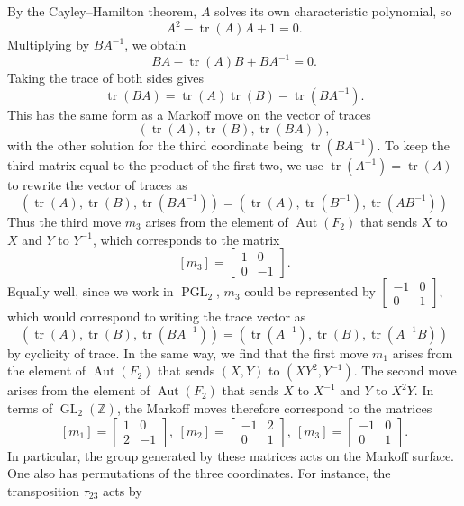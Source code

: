 \documentclass[AHL, Unicode, longabstracts, published]{cedram}
\newcommand{\Z}{\mathbb{Z}}
\DeclareMathOperator{\tr}{tr}
\DeclareMathOperator{\GL}{GL}
\DeclareMathOperator{\PGL}{PGL}
\DeclareMathOperator{\Aut}{Aut}
\DeclareMathOperator{\GL}{GL}
\newcommand{\Z}{\mathbb{Z}}
\begin{document}
By the Cayley--Hamilton theorem, $A$ solves its own characteristic polynomial, so
\[
A^2 - \tr(A)A + 1 = 0.
\]
Multiplying by $BA^{-1}$, we obtain
\[
BA - \tr(A)B+ BA^{-1} = 0.
\]
Taking the trace of both sides gives
\[
\tr(BA) = \tr(A)\tr(B) - \tr\left(BA^{-1}\right).
\]
This has the same form as a Markoff move on the vector of traces
\[
(\tr(A),\tr(B),\tr(BA)),
\]
with the other solution for the third coordinate being $\tr(BA^{-1})$. To keep the third matrix equal to the product of the first two, we use $\tr(A^{-1}) = \tr(A)$ to rewrite the vector of traces as
\[
\left(\tr(A),\tr(B),\tr\left(BA^{-1}\right)\right) = \left(\tr(A), \tr\left(B^{-1}\right), \tr\left(AB^{-1}\right)\right)
\]
Thus the third move $m_3$ arises from the element of $\Aut(F_2)$ that sends $X$ to $X$ and $Y$ to $Y^{-1}$, which corresponds to the matrix
\[
[m_3] =
\begin{bmatrix} 1 & 0 \\ 0 & -1
\end{bmatrix}.
\]
Equally well, since we work in $\PGL_2$, $m_3$ could be represented by $\left[
\begin{smallmatrix} -1 & 0 \\ 0 & 1
\end{smallmatrix}\right]$, which would correspond to writing the trace vector as
\[
\left(\tr(A),\tr(B),\tr\left(BA^{-1}\right)\right) = \left(\tr\left(A^{-1}\right), \tr(B), \tr\left(A^{-1} B\right)\right)
\]
by cyclicity of trace. In the same way, we find that the first move $m_1$ arises from the element of $\Aut(F_2)$ that sends $(X,Y)$ to $(XY^2,Y^{-1})$. The second move arises from the element of $\Aut(F_2)$ that sends $X$ to $X^{-1}$ and $Y$ to $X^2Y$. In terms of $\GL_2(\Z)$, the Markoff moves therefore correspond to the matrices
\begin{equation}\label{eqn:markoff-matrices}
[m_1] =
\begin{bmatrix}
1 & 0 \\
2 & -1
\end{bmatrix},\: [m_2] =
\begin{bmatrix}
-1 & 2 \\
0 & 1
\end{bmatrix},\: [m_3] =
\begin{bmatrix}
-1 & 0 \\
0 & 1
\end{bmatrix}.
\end{equation}
In particular, the group generated by these matrices acts on the Markoff surface. One also has permutations of the three coordinates. For instance, the transposition $\tau_{23}$ acts by
\end{document}
